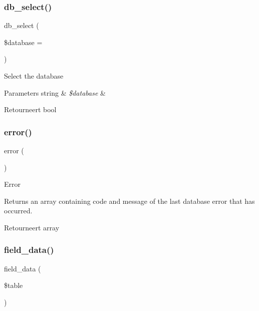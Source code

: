 \subsubsection{\texorpdfstring{db\_select()}{db\_select()}}
{\footnotesize\ttfamily db\+\_\+select (\begin{DoxyParamCaption}\item[{}]{\$database = {\ttfamily \textquotesingle{}\textquotesingle{}} }\end{DoxyParamCaption})}

Select the database


\begin{DoxyParams}[1]{Parameters}
string & {\em \$database} & \\
\hline
\end{DoxyParams}
\begin{DoxyReturn}{Retourneert}
bool 
\end{DoxyReturn}
\mbox{\label{class_c_i___d_b__mssql__driver_a43b8d30b879d4f09ceb059b02af2bc02}} 
\subsubsection{\texorpdfstring{error()}{error()}}
{\footnotesize\ttfamily error (\begin{DoxyParamCaption}{ }\end{DoxyParamCaption})}

Error

Returns an array containing code and message of the last database error that has occurred.

\begin{DoxyReturn}{Retourneert}
array 
\end{DoxyReturn}
\mbox{\label{class_c_i___d_b__mssql__driver_a90355121e1ed009e0efdbd544ab56efa}} 
\subsubsection{\texorpdfstring{field\_data()}{field\_data()}}
{\footnotesize\ttfamily field\+\_\+data (\begin{DoxyParamCaption}\item[{}]{\$table }\end{DoxyParamCaption})}

